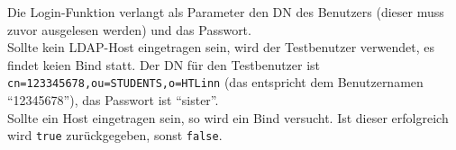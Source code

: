 
Die Login-Funktion verlangt als Parameter den DN des Benutzers (dieser muss zuvor ausgelesen werden) und das Passwort.\\
Sollte kein LDAP-Host eingetragen sein, wird der Testbenutzer verwendet, es findet keien Bind statt. Der DN für den Testbenutzer ist \texttt{cn=123345678,ou=STUDENTS,o=HTLinn} (das entspricht dem Benutzernamen \enquote{12345678}), das Passwort ist \enquote{sister}.\\
Sollte ein Host eingetragen sein, so wird ein Bind versucht. Ist dieser erfolgreich wird \texttt{true} zurückgegeben, sonst \texttt{false}.